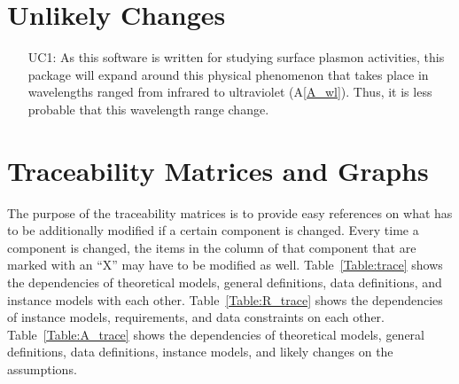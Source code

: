\documentclass[12pt]{article}
\begin{document}
	\section{Unlikely Changes}
	
	\noindent \begin{itemize}
		
		\item[UC1\label{LC_wavelength}:] As this software
		is written for studying surface plasmon activities, this package will expand
		around this physical phenomenon that takes place in wavelengths ranged from
		infrared to ultraviolet (A\ref{A_wl}). Thus, it is less probable that this
		wavelength range change.
		

	\end{itemize}
	
	\section{Traceability Matrices and Graphs}
	
	The purpose of the traceability matrices is to provide easy references on what
	has to be additionally modified if a certain component is changed.  Every time a
	component is changed, the items in the column of that component that are marked
	with an ``X'' may have to be modified as well.  Table~\ref{Table:trace} shows
	the dependencies of theoretical models, general definitions, data definitions,
	and instance models with each other. Table~\ref{Table:R_trace} shows the
	dependencies of instance models, requirements, and data constraints on each
	other. Table~\ref{Table:A_trace} shows the dependencies of theoretical models,
	general definitions, data definitions, instance models, and likely changes on
	the assumptions.
	
\end{document}
